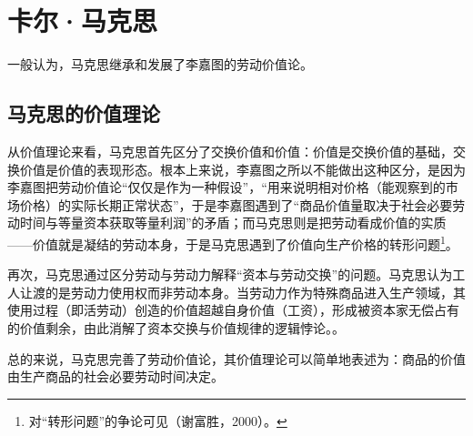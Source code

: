 \section{卡尔·马克思}

一般认为，马克思继承和发展了李嘉图的劳动价值论\cite[347]{YueSeFu*XiongBiTeJingJiFenXiShiDi2Juan2017}\cite[84]{ChenDaiSunCongGuDianJingJiXuePaiDaoMaKeSiRuoGanZhuYaoXueShuoFaZhanLueLun2014}。

\subsection{马克思的价值理论}

从价值理论来看，马克思首先区分了交换价值和价值：价值是交换价值的基础，交换价值是价值的表现形态\cite[86-88]{ChenDaiSunCongGuDianJingJiXuePaiDaoMaKeSiRuoGanZhuYaoXueShuoFaZhanLueLun2014}。根本上来说，李嘉图之所以不能做出这种区分，是因为李嘉图把劳动价值论“仅仅是作为一种假设”，“用来说明相对价格（能观察到的市场价格）的实际长期正常状态”\cite[348]{YueSeFu*XiongBiTeJingJiFenXiShiDi2Juan2017}，于是李嘉图遇到了“商品价值量取决于社会必要劳动时间与等量资本获取等量利润”的矛盾\cite[144]{CaiJiMingCongGuDianZhengZhiJingJiXueDaoZhongGuoTeSeSheHuiZhuYiZhengZhiJingJiXueJiYuZhongGuoShiJiaoDeZhengZhiJingJiXueYanBianShangCe2023}\cite[21-28]{DaWei*LiJiaTuZhengZhiJingJiXueJiFuShuiYuanLi2021}；而马克思则是把劳动看成价值的实质——价值就是凝结的劳动本身，于是马克思遇到了价值向生产价格的转形问题\footnote{对“转形问题”的争论可见（谢富胜，2000）\cite{XieFuShengXiFangXueZheGuanYuMaKeSiJieZhiZhuanXingLiLunYanJiuShuPing2000}。}\cite[348-350]{YueSeFu*XiongBiTeJingJiFenXiShiDi2Juan2017}\cite[159]{CaiJiMingCongGuDianZhengZhiJingJiXueDaoZhongGuoTeSeSheHuiZhuYiZhengZhiJingJiXueJiYuZhongGuoShiJiaoDeZhengZhiJingJiXueYanBianShangCe2023}。

再次，马克思通过区分劳动与劳动力解释“资本与劳动交换”的问题。马克思认为工人让渡的是劳动力使用权而非劳动本身。当劳动力作为特殊商品进入生产领域，其使用过程（即活劳动）创造的价值超越自身价值（工资），形成被资本家无偿占有的价值剩余，由此消解了资本交换与价值规律的逻辑悖论。\cite[615,581-606]{ZhongGongZhongYangMaKeSiEnGeSiLieNingSiDaLinZhuZuoBianYiJuMaKeSiEnGeSiWenJiDi5Juan2009}\cite[157-158]{CaiJiMingCongGuDianZhengZhiJingJiXueDaoZhongGuoTeSeSheHuiZhuYiZhengZhiJingJiXueJiYuZhongGuoShiJiaoDeZhengZhiJingJiXueYanBianShangCe2023}\cite[348]{YueSeFu*XiongBiTeJingJiFenXiShiDi2Juan2017}。

总的来说，马克思完善了劳动价值论，其价值理论可以简单地表述为：商品的价值由生产商品的社会必要劳动时间决定\cite[51-52]{ZhongGongZhongYangMaKeSiEnGeSiLieNingSiDaLinZhuZuoBianYiJuMaKeSiEnGeSiWenJiDi5Juan2009}。

